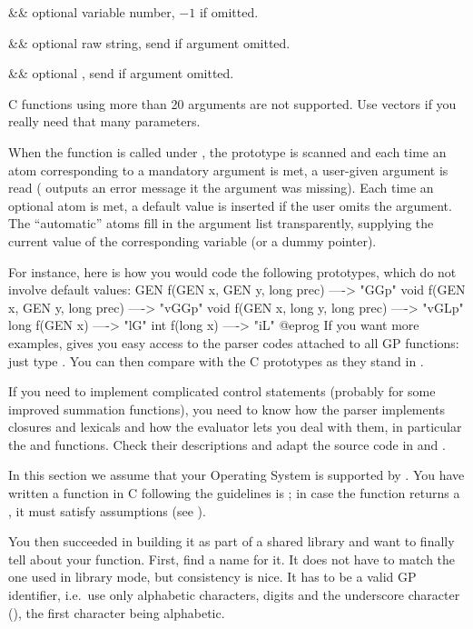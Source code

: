 \+&& optional variable number, $-1$ if omitted.\cr

\+&& optional raw string, send  if argument omitted.\cr

\+&& optional , send  if argument omitted.\cr

 C functions using more than 20 arguments are not
supported. Use vectors if you really need that many parameters.

When the function is called under , the prototype is scanned and each
time an atom corresponding to a mandatory argument is met, a user-given
argument is read ( outputs an error message it the argument was
missing). Each time an optional atom is met, a default value is inserted if the
user omits the argument. The ``automatic'' atoms fill in the argument list
transparently, supplying the current value of the corresponding variable (or a
dummy pointer).

For instance, here is how you would code the following prototypes, which
do not involve default values:
\bprog
GEN f(GEN x, GEN y, long prec)   ----> "GGp"
void f(GEN x, GEN y, long prec)  ----> "vGGp"
void f(GEN x, long y, long prec) ----> "vGLp"
long f(GEN x)                    ----> "lG"
int f(long x)                    ----> "iL"
@eprog\noindent
If you want more examples,  gives you easy access to the parser codes
attached to all GP functions: just type . You
can then compare with the C prototypes as they stand in .

 If you need to implement complicated control statements
(probably for some improved summation functions), you need to know
how the parser implements closures and lexicals and how the evaluator lets
you deal with them, in particular the  and 
functions. Check their descriptions and adapt the source code in
 and .


In this section we assume that your Operating System is supported by
. You have written a function in C following the guidelines is
; in case the function returns a , it
must satisfy  assumptions (see ).

You then succeeded in building it as part of a shared library and want to
finally tell  about your function. First, find a name for it. It does
not have to match the one used in library mode, but consistency is nice. It
has to be a valid GP identifier, i.e.~use only alphabetic characters, digits
and the underscore character (\kbd{\_}), the first character being
alphabetic.

